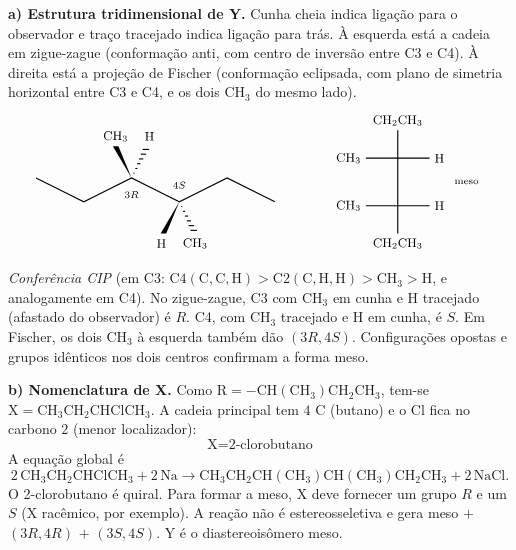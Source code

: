 \documentclass{article}%
\begin{document}
\textbf{a) Estrutura tridimensional de Y.} Cunha cheia indica ligação para o observador e traço tracejado indica ligação para trás. À esquerda está a cadeia em zigue-zague (conformação anti, com centro de inversão entre C3 e C4). À direita está a projeção de Fischer (conformação eclipsada, com plano de simetria horizontal entre C3 e C4, e os dois $\mathrm{CH_3}$ do mesmo lado).
\[
\begin{tikzpicture}[font=\small]
  \draw[thick] (-1.2,0.6)--(0,0)--(1.2,0.6)--(2.4,0)--(3.6,0.6)--(4.8,0);
  \fill (1.2,0.6) -- (0.73,1.4) -- (0.87,1.4) -- cycle;
  \foreach \t in {0.15,0.3,0.45,0.6,0.75,0.9}{\draw[line width=0.8pt] ({1.2+0.4*\t-0.09*\t},{0.6+0.8*\t}) -- ({1.2+0.4*\t+0.09*\t},{0.6+0.8*\t});}
  \node at (0.8,1.65) {$\mathrm{CH_3}$};
  \node at (1.65,1.65) {$\mathrm{H}$};
  \fill (2.4,0) -- (1.93,-0.8) -- (2.07,-0.8) -- cycle;
  \foreach \t in {0.15,0.3,0.45,0.6,0.75,0.9}{\draw[line width=0.8pt] ({2.4+0.4*\t-0.09*\t},{-0.8*\t}) -- ({2.4+0.4*\t+0.09*\t},{-0.8*\t});}
  \node at (2.8,-1.05) {$\mathrm{CH_3}$};
  \node at (1.95,-1.05) {$\mathrm{H}$};
  \node at (1.2,0.18) {\scriptsize $3R$};
  \node at (2.4,0.42) {\scriptsize $4S$};
\end{tikzpicture}
\qquad\qquad
\begin{tikzpicture}[font=\small]
  \draw[thick] (0,-1.3)--(0,1.3);
  \draw[thick] (-0.8,0.6)--(0.8,0.6);
  \draw[thick] (-0.8,-0.6)--(0.8,-0.6);
  \node at (0,1.55) {$\mathrm{CH_2CH_3}$};
  \node at (0,-1.55) {$\mathrm{CH_2CH_3}$};
  \node[left] at (-0.8,0.6) {$\mathrm{CH_3}$};
  \node[right] at (0.8,0.6) {$\mathrm{H}$};
  \node[left] at (-0.8,-0.6) {$\mathrm{CH_3}$};
  \node[right] at (0.8,-0.6) {$\mathrm{H}$};
  \node[right] at (1.3,0) {\scriptsize meso};
\end{tikzpicture}
\]
\emph{Conferência CIP} (em C3: $\mathrm{C4}(\mathrm{C,C,H})>\mathrm{C2}(\mathrm{C,H,H})>\mathrm{CH_3}>\mathrm{H}$, e analogamente em C4). No zigue-zague, C3 com $\mathrm{CH_3}$ em cunha e $\mathrm{H}$ tracejado (afastado do observador) é $R$. C4, com $\mathrm{CH_3}$ tracejado e $\mathrm{H}$ em cunha, é $S$. Em Fischer, os dois $\mathrm{CH_3}$ à esquerda também dão $(3R,4S)$. Configurações opostas e grupos idênticos nos dois centros confirmam a forma meso.

\textbf{b) Nomenclatura de X.} Como $\mathrm{R}=\mathrm{{-}CH(CH_3)CH_2CH_3}$, tem-se $\mathrm{X}=\mathrm{CH_3CH_2CHClCH_3}$. A cadeia principal tem $4$ C (butano) e o Cl fica no carbono $2$ (menor localizador):
\[
\boxed{\text{X} = \text{2-clorobutano}}
\]
A equação global é
\[
2\,\mathrm{CH_3CH_2CHClCH_3} + 2\,\mathrm{Na} \to \mathrm{CH_3CH_2CH(CH_3)CH(CH_3)CH_2CH_3} + 2\,\mathrm{NaCl}.
\]
O 2-clorobutano é quiral. Para formar a meso, X deve fornecer um grupo $R$ e um $S$ (X racêmico, por exemplo). A reação não é estereosseletiva e gera meso $+$ $(3R,4R)$ $+$ $(3S,4S)$. Y é o diastereoisômero meso.
\end{document}
